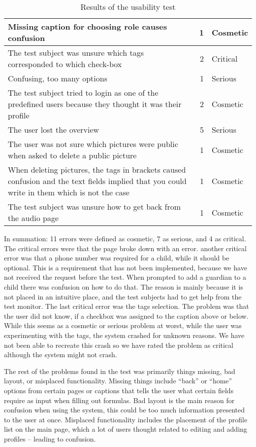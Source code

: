 \begin{table}
\begin{tabular}{|p{7cm}|r|l|}
		Missing caption for choosing role causes confusion & 1 & Cosmetic \\ \hline
		The test subject was unsure which tags corresponded to which check-box & 2 & Critical \\ \hline
		Confusing, too many options & 1 & Serious \\ \hline
		The test subject tried to login as one of the predefined users because they thought it was their profile & 2 & Cosmetic \\ \hline
		The user lost the overview & 5 & Serious \\ \hline
		The user was not sure which pictures were public when asked to delete a public picture & 1 & Cosmetic \\ \hline
		When deleting pictures, the tags in brackets caused confusion and the text fields implied that you could write in them which is not the case & 1 & Cosmetic \\ \hline
		The test subject was unsure how to get back from the audio page & 1 & Cosmetic \\
		\hline
	\end{tabular}
	\caption{Results of the usability test}
	\label{tab:results}
\end{table}

In summation: 11 errors were defined as cosmetic, 7 as serious, and 4 as critical. \\

The critical errors were that the page broke down with an error. another critical error was that a phone number was required for a child, while it should be optional.
This is a requirement that has not been implemented, because we have not received the request before the test.
When prompted to add a guardian to a child there was confusion on how to do that.
The reason is mainly because it is not placed in an intuitive place, and the test subjects had to get help from the test monitor.
The last critical error was the tags selection. The problem was that the user did not know, if a checkbox was assigned to the caption above or below. While this seems as a cosmetic or serious problem at worst, while the user was experimenting with the tags, the system crashed for unknown reasons. We have not been able to recreate this crash so we have rated the problem as critical although the system might not crash.

The rest of the problems found in the test was primarily things missing, bad layout, or misplaced functionality.
Missing things include ``back'' or ``home'' options from certain pages or captions that tells the user what certain fields require as input when filling out formulas. Bad layout is the main reason for confusion when using the system, this could be too much information presented to the user at once.
Misplaced functionality includes the placement of the profile list on the main page, which a lot of users thought related to editing and adding profiles -- leading to confusion. 